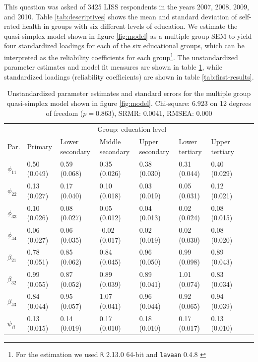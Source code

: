 \documentclass[a4paper,11pt]{article}
\newcommand{\0}{\boldsymbol{0}}
\newcommand{\R}{\texttt{R} 2.13.0 64-bit \citep{R}\;}
\newcommand{\lavaan}{\texttt{lavaan} 0.4.8 \citep{lavaan}\;}
\begin{document}
This question was asked of 3425 LISS respondents in the years 2007, 2008, 2009, and 2010. 
Table \ref{tab:descriptives} shows the mean and standard deviation of self-rated health in
groups with six different levels of education.
We estimate the quasi-simplex model shown in figure \ref{fig:model} as a multiple group SEM
to yield four standardized loadings for each of the six educational groups, which can be interpreted as the reliability coefficients for each group\footnote{For the estimation we used \R and \lavaan}. The unstandardized parameter estimates and model fit measures are shown in table \ref{tab:results-unstandardized}, while standardized loadings (reliability coefficients) are shown in table \ref{tab:first-results}.

\begin{table}\begin{small}
\begin{tabularx}{\textwidth}{l*{8}{X}}
  \hline  \hline
  	& \multicolumn{6}{c}{Group: education level}\\	\cline{2-7}
    Par.  &       Primary         & Lower secondary & Middle secondary & Upper secondary & Lower tertiary & Upper tertiary\\
  \hline
$\phi_{11}$   & 0.50 (0.049) & 0.59 (0.068) & 0.35 (0.026) & 0.38 (0.030) & 0.31 (0.044) & 0.40 (0.029) \\ 
$\phi_{22}$   & 0.13 (0.027) & 0.17 (0.040) & 0.10 (0.018) & 0.03 (0.019) & 0.05 (0.031) & 0.12 (0.021) \\ 
$\phi_{33}$   & 0.10 (0.026) & 0.08 (0.027) & 0.05 (0.012) & 0.04 (0.013) & 0.02 (0.024) & 0.08 (0.015) \\ 
$\phi_{44}$   & 0.06 (0.027) & 0.06 (0.035) & -0.02 (0.017) & 0.02 (0.019) & 0.02 (0.030) & 0.08 (0.020) \\ 
$\beta_{21}$  & 0.78 (0.051) & 0.85 (0.062) & 0.84 (0.045) & 0.96 (0.050) & 0.99 (0.098) & 0.89 (0.043) \\ 
$\beta_{32}$  & 0.99 (0.055) & 0.87 (0.052) & 0.89 (0.039) & 0.89 (0.041) & 1.01 (0.074) & 0.83 (0.034) \\ 
$\beta_{43}$  & 0.84 (0.044) & 0.95 (0.057) & 1.07 (0.041) & 0.96 (0.044) & 0.92 (0.065) & 0.94 (0.039) \\ 
$\psi_{ii}$   & 0.13 (0.015) & 0.14 (0.019) & 0.17 (0.010) & 0.18 (0.010) & 0.17 (0.017) & 0.13 (0.010) \\ 
     \hline  \hline
\end{tabularx}\caption{Unstandardized parameter estimates and standard errors for the 
multiple group quasi-simplex model shown in figure \ref{fig:model}.
Chi-square:  6.923 on  12 degrees of freedom  ($p = 0.863$),  SRMR:  0.0041, RMSEA: 0.000}
\label{tab:results-unstandardized}
\end{small}\end{table}
\end{document}
